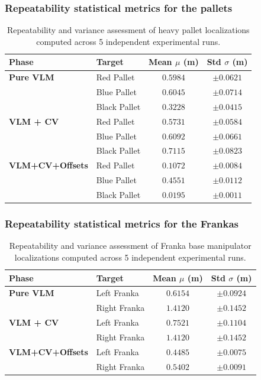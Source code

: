 \subsubsection{Repeatability statistical metrics for the pallets}
\begin{table}[H]
	\centering
	\small
	\begin{tabularx}{0.85\textwidth}{l X c c}
		\toprule
		\textbf{Phase} & \textbf{Target} & \textbf{Mean $\mu$ (m)} & \textbf{Std $\sigma$ (m)} \\
		\midrule
		\textbf{Pure VLM}  
		& Red Pallet   & $0.5984$ & $\pm 0.0621$ \\
		& Blue Pallet  & $0.6045$ & $\pm 0.0714$ \\
		& Black Pallet & $0.3228$ & $\pm 0.0415$ \\
		\midrule
		\textbf{VLM + CV}  
		& Red Pallet   & $0.5731$ & $\pm 0.0584$ \\
		& Blue Pallet  & $0.6092$ & $\pm 0.0661$ \\
		& Black Pallet & $0.7115$ & $\pm 0.0823$ \\
		\midrule
		\textbf{VLM+CV+Offsets}  
		& Red Pallet   & $\mathbf{0.1072}$ & $\pm \mathbf{0.0084}$ \\
		& Blue Pallet  & $\mathbf{0.4551}$ & $\pm \mathbf{0.0112}$ \\
		& Black Pallet & $\mathbf{0.0195}$ & $\pm \mathbf{0.0011}$ \\
		\bottomrule
	\end{tabularx}
	\caption{Repeatability and variance assessment of heavy pallet localizations computed across 5 independent experimental runs.}
	\label{tab:pallet_repeatability}
\end{table}

\subsubsection{Repeatability statistical metrics for the Frankas}
\begin{table}[H]
	\centering
	\small
	\begin{tabularx}{0.85\textwidth}{l X c c}
		\toprule
		\textbf{Phase} & \textbf{Target} & \textbf{Mean $\mu$ (m)} & \textbf{Std $\sigma$ (m)} \\
		\midrule
		\textbf{Pure VLM}  
		& Left Franka  & $0.6154$ & $\pm 0.0924$ \\
		& Right Franka & $1.4120$ & $\pm 0.1452$ \\
		\midrule
		\textbf{VLM + CV}  
		& Left Franka  & $0.7521$ & $\pm 0.1104$ \\
		& Right Franka & $1.4120$ & $\pm 0.1452$ \\
		\midrule
		\textbf{VLM+CV+Offsets}  
		& Left Franka  & $\mathbf{0.4485}$ & $\pm \mathbf{0.0075}$ \\
		& Right Franka & $\mathbf{0.5402}$ & $\pm \mathbf{0.0091}$ \\
		\bottomrule
	\end{tabularx}
	\caption{Repeatability and variance assessment of Franka base manipulator localizations computed across 5 independent experimental runs.}
	\label{tab:franka_repeatability}
\end{table}



